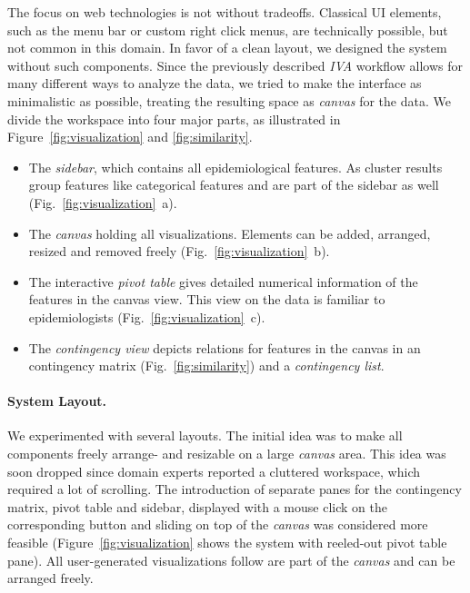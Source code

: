 \documentclass[journal]{style/vgtc} 			          %
\begin{document}
The focus on web technologies is not without tradeoffs.
%
Classical UI elements, such as the menu bar or custom right click menus, are technically possible, but not common in this domain.
%
In favor of a clean layout, we designed the system without such components.
%
Since the previously described \emph{IVA} workflow allows for many different ways to analyze the data, we tried to make the interface as minimalistic as possible, treating the resulting space as \emph{canvas} for the data.
%
We divide the workspace into four major parts, as illustrated in Figure~\ref{fig:visualization} and \ref{fig:similarity}.
\begin{itemize} \itemsep0.2em
		\item The \emph{sidebar}, which contains all epidemiological features. As cluster results group features like categorical features and are part of the sidebar as well (Fig.~\ref{fig:visualization}~a).
	\item The \emph{canvas} holding all visualizations. Elements can be added, arranged, resized and removed freely (Fig.~\ref{fig:visualization}~b).
	\item The interactive \emph{pivot table} gives detailed numerical information of the features in the canvas view. This view on the data is familiar to epidemiologists (Fig.~\ref{fig:visualization}~c).
	\item The \emph{contingency view} depicts relations for features in the canvas in an contingency matrix (Fig.~\ref{fig:similarity}) and a \emph{contingency list}.
\end{itemize}

\paragraph{System Layout.}
We experimented with several layouts.
%
The initial idea was to make all components freely arrange- and resizable on a large \emph{canvas} area.
%
This idea was soon dropped since domain experts reported a cluttered workspace, which required a lot of scrolling.
%
The introduction of separate panes for the contingency matrix, pivot table and sidebar, displayed with a mouse click on the corresponding button and sliding on top of the \emph{canvas} was considered more feasible (Figure~\ref{fig:visualization} shows the system with reeled-out pivot table pane).
%
All user-generated visualizations follow are part of the \emph{canvas} and can be arranged freely.
\end{document}
